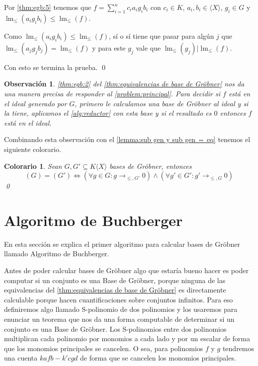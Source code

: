 \documentclass[12pt]{report}
\theoremstyle{customstyle}
\newtheorem{colorary}[theorem]{Colorario}
\newtheorem{observation}[theorem]{Observación}
\renewenvironment{proof}[1][\proofname]{{\noindent \bfseries #1: }}{\qed} %
\theoremstyle{factstyle}
\DeclareMathOperator{\lm}{lm}
\begin{document}
\begin{proof}
\begin{description}
\begin{description}
      Por \ref{thm:egb:5} tenemos que $f = ∑_{i = 1}^n c_i a_i g_i b_i$ con $c_i ∈ K$, $a_i, b_i ∈ ⟨X⟩$, $g_i ∈ G$ y $\lm_≤(a_i g_i b_i) ≤ \lm_≤(f)$.

      Como $\lm_≤(a_i g_i b_i) ≤ \lm_≤(f)$, sí o sí tiene que pasar para algún $j$ que $\lm_≤(a_j g_j b_j) = \lm_≤(f)$ y para este $g_j$ vale que $\lm_≤(g_j) | \lm_≤(f)$.
    \end{description}

  \end{description}
  Con esto se termina la prueba.
\end{proof}

\begin{observation}
  \ref{thm:egb:2} del \cref{thm:equivalencias de base de Gröbner} nos da una manera precisa de responder al \cref{problem:principal}. Para decidir si $f$ está en el ideal generado por $G$, primero le calculamos una base de Gröbner al ideal y si la tiene, aplicamos el \cref{alg:reductor} con esta base y si el resultado es $0$ entonces $f$ está en el ideal.
\end{observation}

Combinando esta observación con el \cref{lemma:sub gen y sub gen ⇔ eq} tenemos el siguiente colorario. %

\begin{colorary}\label{col:(G) = (G') cond}
  Sean $G, G' ⊆ K⟨X⟩$ bases de Gröbner, entonces
  \[ (G) = (G') ⇔ (∀g ∈ G : g →_{≤, G'} 0) ∧ (∀g' ∈ G' : g' →_{≤, G} 0)\]
  \qed
\end{colorary}


\section{Algoritmo de Buchberger}

En esta sección se explica el primer algoritmo para calcular bases de Gröbner llamado Algoritmo de Buchberger.

Antes de poder calcular bases de Gröbner algo que estaría bueno hacer es poder computar si un conjunto es una Base de Gröbner, porque ninguna de las equivalencias del \cref{thm:equivalencias de base de Gröbner} es directamente calculable porque hacen cuantificaciones sobre conjuntos infinitos. Para eso definiremos algo llamado S-polinomio de dos polinomios y los usaremos para enunciar un teorema que nos da una forma computable de determinar si un conjunto es una Base de Gröbner. Los S-polinomios entre dos polinomios multiplican cada polinomio por monomios a cada lado y por un escalar de forma que los monomios principales se cancelen. O sea, para polinomios $f$ y $g$ tendremos una cuenta $k a f b - k' c g d$ de forma que se cancelen los monomios principales.
\end{document}
